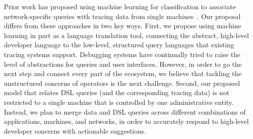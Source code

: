 
Prior work has proposed using machine learning for classification to associate
network-specific queries with tracing data from single
machines~\cite{netpoirot}. Our proposal differs from these approaches in two
key ways. First, we propose using machine learning in part as a language
translation tool, connecting the abstract, high-level developer language to the
low-level, structured query languages that existing tracing systems support.
Debugging systems have continually tried to raise the level of abstractions for
queries and user interfaces. However, in order to go the next step and connect
every part of the ecosystem, we believe that tackling the unstructured concerns
of operators is the next challenge. Second, our proposed model that relates DSL
queries (and the corresponding tracing data) is not restricted to a single
machine that is controlled by one administrative entity. Instead, we plan to
merge data and DSL queries across different combinations of applications,
machines, and networks, in order to accurately respond to high-level developer
concerns with actionable suggestions.


